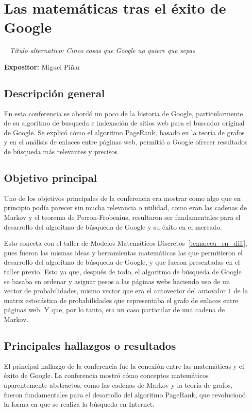 \documentclass[11pt]{article}
\begin{document}
    \section{Las matemáticas tras el éxito de Google}~\label{tema:google}
    \textit{Título alternativo: Cinco cosas que Google no quiere que sepas}

    \textbf{Expositor:} Miguel Piñar

    \subsection{Descripción general}
    En esta conferencia se abordó un poco de la historia de Google, particularmente de su algoritmo de busqueda e indexación de sitios web para el buscador original de Google. Se explicó cómo el algoritmo PageRank, basado en la teoría de grafos y en el análisis de enlaces entre páginas web, permitió a Google ofrecer resultados de búsqueda más relevantes y precisos.

    \subsection{Objetivo principal}
    Uno de los objetivos principales de la conferencia era mostrar como algo que en principio podía parecer sin mucha relevancia o utilidad, como eran las cadenas de Markov y el teorema de Perron-Frobenius, resultaron ser fundamentales para el desarrollo del algoritmo de búsqueda de Google y su éxito en el mercado.

    Esto conecta con el taller de Modelos Matemáticos Discretos~\ref{tema:ecu_en_diff}, pues fueron las mismas ideas y herramientas matemáticas las que permitieron el desarrollo del algoritmo de búsqueda de Google, y que fueron presentadas en el taller previo. Esto ya que, después de todo, el algoritmo de búsqueda de Google se basaba en ordenar y asignar pesos a las páginas webs haciendo uso de un vector de probabilidades, mismo vector que era el autovector del autovalor $1$ de la matriz estocástica de probabilidades que representaba el grafo de enlaces entre páginas web. Y que, por lo tanto, era un caso particular de una cadena de Markov.

    \subsection{Principales hallazgos o resultados}
    El principal hallazgo de la conferencia fue la conexión entre las matemáticas y el éxito de Google. La conferencia mostró cómo conceptos matemáticos aparentemente abstractos, como las cadenas de Markov y la teoría de grafos, fueron fundamentales para el desarrollo del algoritmo PageRank, que revolucionó la forma en que se realiza la búsqueda en Internet.
\end{document}
